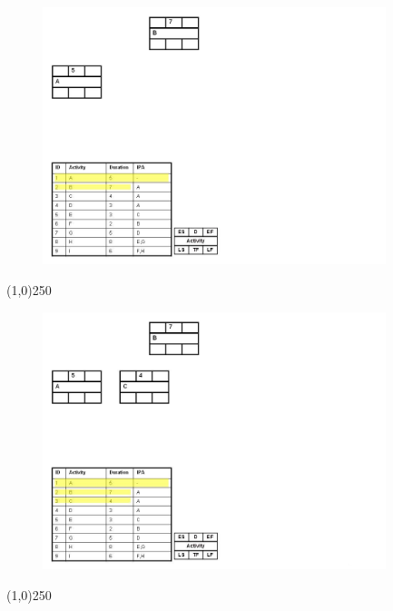 \begin{frame}
\begin{figure}
	\centering
		\includegraphics[width = 10.0cm]{oldnotes/Slide128.jpg}
\end{figure}
\end{frame}
\begin{center}\line(1,0){250}\end{center}


\begin{frame}
\begin{figure}
	\centering
		\includegraphics[width = 10.0cm]{oldnotes/Slide129.jpg}
\end{figure}
\end{frame}
\begin{center}\line(1,0){250}\end{center}


